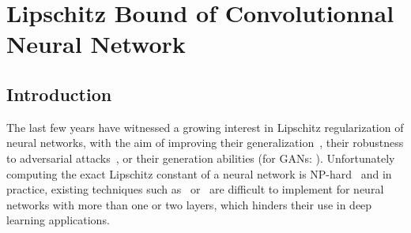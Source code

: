 
\chapter{Lipschitz Bound of Convolutionnal Neural Network}
\label{chapter:lipschitz_bound}
\localtableofcontents



\section{Introduction}


The last few years have witnessed a growing interest in Lipschitz regularization of neural networks, with the aim of improving their generalization~\cite{bartlett2017spectrally}, their robustness to adversarial attacks~\cite{tsuzuku2018lipschitz, farnia2018generalizable}, or their generation abilities (\eg for GANs: \cite{miyato2018spectral,arjovsky2017wasserstein}).
Unfortunately computing  the exact Lipschitz constant of a neural network is NP-hard~\cite{scaman2018lipschitz} and in practice, existing techniques such as~\cite{scaman2018lipschitz, NIPS2019_9319} or~\cite{latorre2020lipschitz} are difficult to implement for neural networks with more than one or two layers, which hinders their use in deep learning applications.


